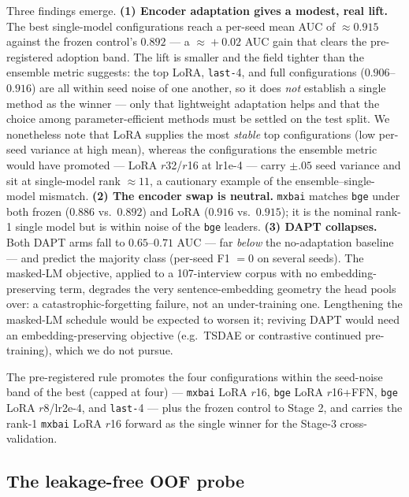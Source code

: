 \documentclass[conference]{IEEEtran}
\begin{document}
Three findings emerge. \textbf{(1) Encoder adaptation gives a modest, real
lift.} The best single-model configurations reach a per-seed mean AUC of
$\approx\!0.915$ against the frozen control's $0.892$ --- a $\approx\!+0.02$ AUC
gain that clears the pre-registered adoption band. The lift is smaller and the
field tighter than the ensemble metric suggests: the top LoRA, \texttt{last-}4,
and full configurations ($0.906$--$0.916$) are all within seed noise of one
another, so it does \emph{not} establish a single method as the winner
--- only that lightweight adaptation helps and that the choice among
parameter-efficient methods must be settled on the test split. We nonetheless
note that LoRA supplies the most \emph{stable} top configurations (low per-seed
variance at high mean), whereas the configurations the ensemble metric would
have promoted --- LoRA $r$32/$r$16 at lr1e-4 --- carry $\pm.05$ seed variance and
sit at single-model rank $\approx\!11$, a cautionary example of the
ensemble--single-model mismatch. \textbf{(2) The encoder swap is neutral.}
\texttt{mxbai} matches \texttt{bge} under both frozen ($0.886$ vs.\ $0.892$) and
LoRA ($0.916$ vs.\ $0.915$); it is the nominal rank-1 single model but is within
noise of the \texttt{bge} leaders. \textbf{(3) DAPT collapses.} Both DAPT arms
fall to $0.65$--$0.71$ AUC --- far \emph{below} the no-adaptation baseline ---
and predict the majority class (per-seed F1 $=0$ on several seeds). The
masked-LM objective, applied to a 107-interview corpus with no
embedding-preserving term, degrades the very sentence-embedding geometry the head
pools over: a catastrophic-forgetting failure, not an under-training one.
Lengthening the masked-LM schedule would be expected to worsen it; reviving DAPT
would need an embedding-preserving objective (e.g.\ TSDAE or contrastive
continued pre-training), which we do not pursue.

The pre-registered rule promotes the four configurations within the seed-noise
band of the best (capped at four) --- \texttt{mxbai} LoRA $r$16,
\texttt{bge} LoRA $r$16+FFN, \texttt{bge} LoRA $r$8/lr2e-4, and \texttt{last-}4 ---
plus the frozen control to Stage 2, and carries the rank-1 \texttt{mxbai} LoRA
$r$16 forward as the single winner for the Stage-3 cross-validation.

\subsection{The leakage-free OOF probe}
\label{sec:finetune-iter1-oof}
\end{document}
